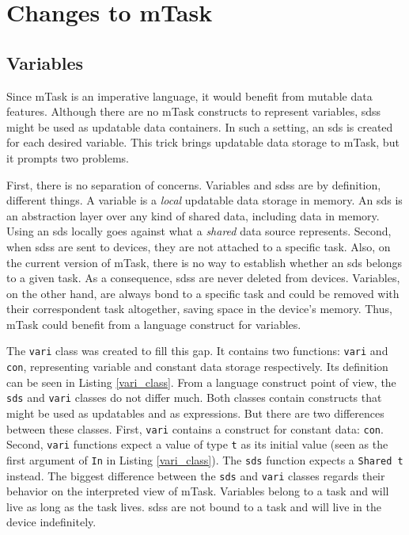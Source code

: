 
\section{Changes to mTask}
\subsection{Variables}

Since \gls{mTask} is an imperative language, it would benefit from mutable data features. Although there are no \gls{mTask} constructs to represent variables, \acp{sds} might be used as updatable data containers. In such a setting, an \ac{sds} is created for each desired variable. This trick brings updatable data storage to \gls{mTask}, but it prompts two problems. 

First, there is no separation of concerns. Variables and \acp{sds} are by definition, different things. A variable is a \textit{local} updatable data storage in memory. An \ac{sds} is an abstraction layer over any kind of shared data, including data in memory. Using an \ac{sds} locally goes against what a \textit{shared} data source represents. Second, when \acp{sds} are sent to devices, they are not attached to a specific task. Also, on the current version of mTask, there is no way to establish whether an \ac{sds} belongs to a given task. As a consequence, \acp{sds} are never deleted from devices. Variables, on the other hand, are always bond to a specific task and could be removed with their correspondent task altogether, saving space in the device's memory. Thus, \gls{mTask} could benefit from a language construct for variables. 

The \texttt{vari} class was created to fill this gap. It contains two functions: \texttt{vari} and \texttt{con}, representing variable and constant data storage respectively. Its definition can be seen in Listing \ref{vari_class}. From a language construct point of view, the \texttt{sds} and \texttt{vari} classes do not differ much. Both classes contain constructs that might be used as updatables and as expressions. But there are two differences between these classes. First, \texttt{vari} contains a construct for constant data: \texttt{con}. Second, \texttt{vari} functions expect a value of type \texttt{t} as its initial value (seen as the first argument of \texttt{In} in Listing \ref{vari_class}). The \texttt{sds} function expects a \texttt{Shared t} instead. The biggest difference between the \texttt{sds} and \texttt{vari} classes regards their behavior on the interpreted view of \gls{mTask}. Variables belong to a task and will live as long as the task lives. \acp{sds} are not bound to a task and will live in the device indefinitely. 



